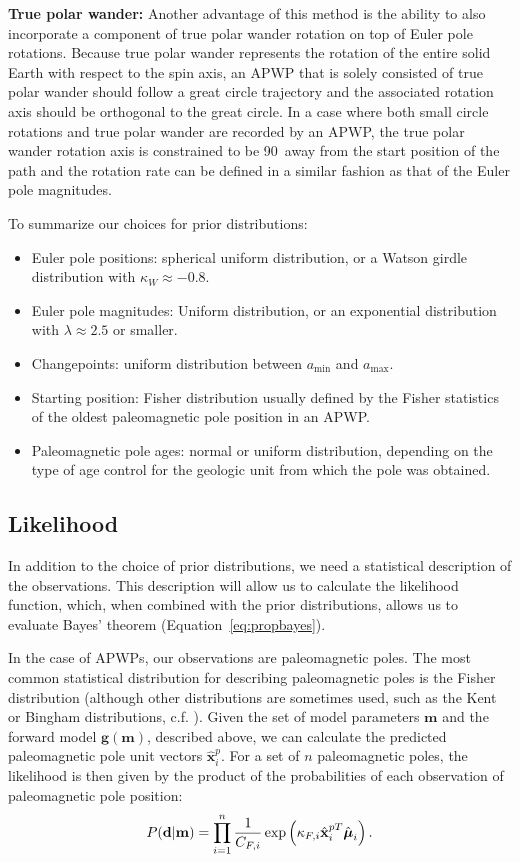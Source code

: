 \documentclass[11pt,letterpaper]{article}
\newcommand{\mitbf}[1]{\hbox{\mathversion{bold}$#1$}}
\begin{document}
\textbf{True polar wander:}
Another advantage of this method is the ability to also incorporate a component of true polar wander rotation on top of Euler pole rotations. Because true polar wander represents the rotation of the entire solid Earth with respect to the spin axis, an APWP that is solely consisted of true polar wander should follow a great circle trajectory and the associated rotation axis should be orthogonal to the great circle. In a case where both small circle rotations and true polar wander are recorded by an APWP, the true polar wander rotation axis is constrained to be 90\textdegree\ away from the start position of the path and the rotation rate can be defined in a similar fashion as that of the Euler pole magnitudes.


To summarize our choices for prior distributions:
\begin{itemize}
\item Euler pole positions: spherical uniform distribution, or a Watson girdle distribution with $\kappa_W \approx -0.8$.
\item Euler pole magnitudes: Uniform distribution, or an exponential distribution with $\lambda \approx 2.5$ or smaller.
\item Changepoints: uniform distribution between $a_\mathrm{min}$ and $a_\mathrm{max}$.
\item Starting position: Fisher distribution usually defined by the Fisher statistics of the oldest paleomagnetic pole position in an APWP.
\item Paleomagnetic pole ages: normal or uniform distribution, depending on the type of age control for the geologic unit from which the pole was obtained.
\end{itemize}

\subsection*{Likelihood}
\label{sec:likelihood}
In addition to the choice of prior distributions, we need a statistical description of the observations. This description will allow us to calculate the likelihood function, which, when combined with the prior distributions, allows us to evaluate Bayes' theorem (Equation~\eqref{eq:propbayes}).

In the case of APWPs, our observations are paleomagnetic poles. The most common statistical distribution for describing paleomagnetic poles is the Fisher distribution (although other distributions are sometimes used, such as the Kent or Bingham distributions, c.f. \citealp{Tauxe2010a}). Given the set of model parameters $\mathbf{m}$ and the forward model $\mathbf{g}(\mathbf{m})$, described above, we can calculate the predicted paleomagnetic pole unit vectors $\hat{\mathbf{x}}_i^p$. For a set of $n$ paleomagnetic poles, the likelihood is then given by the product of the probabilities of each observation of paleomagnetic pole position:
\begin{equation}
P(\mathbf{d} \vert \mathbf{m}) = \displaystyle\prod_{i=1}^n \frac{1}{C_{F,i}} \exp \left( \kappa_{F,i} \hat{\mathbf{x}}_{i}^{pT} \hat{\mitbf{\mu}}_i \right).
\label{eq:model_likelihood}
\end{equation}
\end{document}
